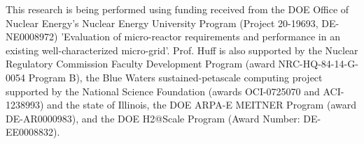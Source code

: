 \documentclass{anstrans}
\begin{document}
This research is being performed using funding received from the DOE Office of Nuclear Energy's Nuclear Energy University Program (Project 20-19693, DE-NE0008972) 'Evaluation of micro-reactor requirements and performance in an existing well-characterized micro-grid'.
Prof. Huff is also supported by the Nuclear Regulatory Commission Faculty Development Program (award NRC-HQ-84-14-G-0054 Program B), the Blue Waters sustained-petascale computing project supported by the National Science Foundation (awards OCI-0725070 and ACI-1238993) and the state of Illinois, the DOE ARPA-E MEITNER Program (award DE-AR0000983), and the DOE H2@Scale Program (Award Number: DE-EE0008832).



\end{document}
